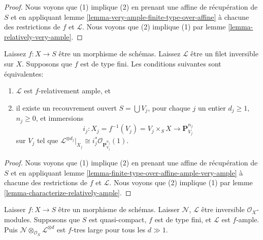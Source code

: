\begin{proof}
Nous voyons que (1) implique (2) en prenant une affine de récupération de $S$ et en appliquant lemme \ref{lemma-very-ample-finite-type-over-affine} à chacune des restrictions de $f$ et $\mathcal{L}$. Nous voyons que (2) implique (1) par lemme \ref{lemma-relatively-very-ample}.
\end{proof}

\begin{lemma}

\label{lemma-characterize-ample-on-finite-type}
Laissez $f : X \to S$ être un morphisme de schémas. Laissez $\mathcal{L}$ être un filet inversible sur $X$. Supposons que $f$ est de type fini. Les conditions suivantes sont équivalentes:
\begin{enumerate}
\item $\mathcal{L}$ est $f$-relativement ample, et
\item il existe un recouvrement ouvert $S = \bigcup V_j$, pour chaque $j$ un entier $d_j \geq 1$, $n_j \geq 0$, et immersions $$
i_j :
X_j = f^{-1}(V_j) = V_j \times_S X
\longrightarrow
\mathbf{P}^{n_j}_{V_j}
$$ sur $V_j$ tel que $\mathcal{L}^{\otimes d_j}|_{X_j} \cong
i_j^*\mathcal{O}_{\mathbf{P}^{n_j}_{V_j}}(1)$.
\end{enumerate}

\end{lemma}

\begin{proof}
Nous voyons que (1) implique (2) en prenant une affine de récupération de $S$ et en appliquant lemme \ref{lemma-finite-type-over-affine-ample-very-ample} à chacune des restrictions de $f$ et $\mathcal{L}$. Nous voyons que (2) implique (1) par lemme \ref{lemma-characterize-relatively-ample}.
\end{proof}

\begin{lemma}

\label{lemma-invertible-add-enough-ample-very-ample}
Laisser $f : X \to S$ être un morphisme de schémas. Laisser $\mathcal{N}$, $\mathcal{L}$ être inversible $\mathcal{O}_X$-modules. Supposons que $S$ est quasi-compact, $f$ est de type fini, et $\mathcal{L}$ est $f$-ample. Puis $\mathcal{N} \otimes_{\mathcal{O}_X} \mathcal{L}^{\otimes d}$ est $f$-tres large pour tous les $d \gg 1$.
\end{lemma}

